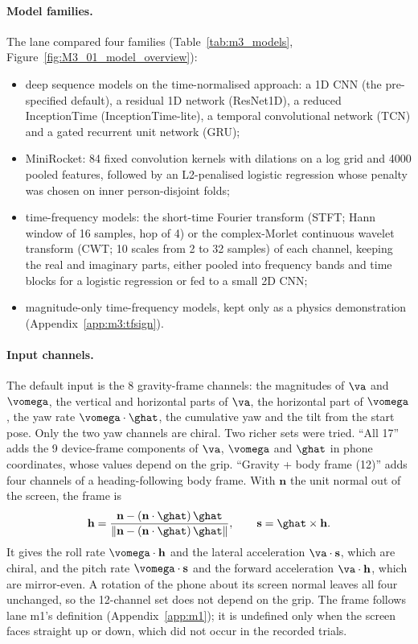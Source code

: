 \paragraph{Model families.}
The lane compared four families (Table~\ref{tab:m3_models}, Figure~\ref{fig:M3_01_model_overview}):
\begin{itemize}
  \item deep sequence models on the time-normalised approach: a 1D CNN (the pre-specified default), a residual 1D network (ResNet1D), a reduced InceptionTime (InceptionTime-lite), a temporal convolutional network (TCN) and a gated recurrent unit network (GRU);
  \item MiniRocket: 84 fixed convolution kernels with dilations on a log grid and 4000 pooled features, followed by an L2-penalised logistic regression whose penalty was chosen on inner person-disjoint folds;
  \item time-frequency models: the short-time Fourier transform (STFT; Hann window of 16 samples, hop of 4) or the complex-Morlet continuous wavelet transform (CWT; 10 scales from 2 to 32 samples) of each channel, keeping the real and imaginary parts, either pooled into frequency bands and time blocks for a logistic regression or fed to a small 2D CNN;
  \item magnitude-only time-frequency models, kept only as a physics demonstration (Appendix~\ref{app:m3:tfsign}).
\end{itemize}

\paragraph{Input channels.}
The default input is the 8 gravity-frame channels: the magnitudes of $\va$ and $\vomega$, the vertical and horizontal parts of $\va$, the horizontal part of $\vomega$, the yaw rate $\vomega\cdot\ghat$, the cumulative yaw and the tilt from the start pose.
Only the two yaw channels are chiral.
Two richer sets were tried.
``All 17'' adds the 9 device-frame components of $\va$, $\vomega$ and $\ghat$ in phone coordinates, whose values depend on the grip.
``Gravity + body frame (12)'' adds four channels of a heading-following body frame.
With $\mathbf{n}$ the unit normal out of the screen, the frame is
\begin{equation}\label{eq:m3-body}
  \mathbf{h} = \frac{\mathbf{n} - (\mathbf{n}\cdot\ghat)\,\ghat}{\lVert \mathbf{n} - (\mathbf{n}\cdot\ghat)\,\ghat \rVert},
  \qquad
  \mathbf{s} = \ghat \times \mathbf{h}.
\end{equation}
It gives the roll rate $\vomega\cdot\mathbf{h}$ and the lateral acceleration $\va\cdot\mathbf{s}$, which are chiral, and the pitch rate $\vomega\cdot\mathbf{s}$ and the forward acceleration $\va\cdot\mathbf{h}$, which are mirror-even.
A rotation of the phone about its screen normal leaves all four unchanged, so the 12-channel set does not depend on the grip.
The frame follows lane m1's definition (Appendix~\ref{app:m1}); it is undefined only when the screen faces straight up or down, which did not occur in the recorded trials.

